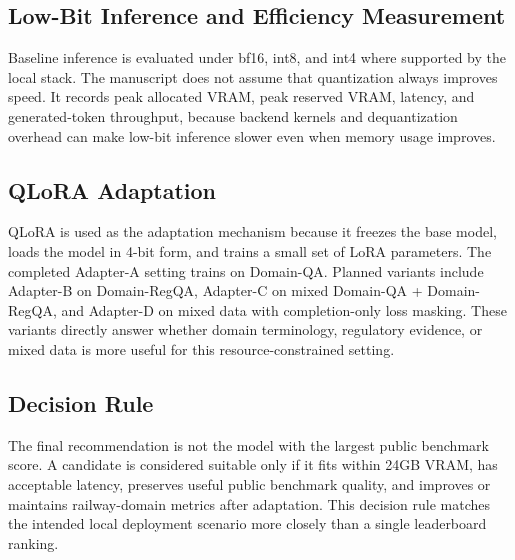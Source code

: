 \subsection{Low-Bit Inference and Efficiency Measurement}

Baseline inference is evaluated under bf16, int8, and int4 where supported by
the local stack. The manuscript does not assume that quantization always
improves speed. It records peak allocated VRAM, peak reserved VRAM, latency,
and generated-token throughput, because backend kernels and dequantization
overhead can make low-bit inference slower even when memory usage improves.

\subsection{QLoRA Adaptation}

QLoRA is used as the adaptation mechanism because it freezes the base model,
loads the model in 4-bit form, and trains a small set of LoRA parameters. The
completed Adapter-A setting trains on Domain-QA. Planned variants include
Adapter-B on Domain-RegQA, Adapter-C on mixed Domain-QA + Domain-RegQA, and
Adapter-D on mixed data with completion-only loss masking. These variants
directly answer whether domain terminology, regulatory evidence, or mixed data
is more useful for this resource-constrained setting.

\subsection{Decision Rule}

The final recommendation is not the model with the largest public benchmark
score. A candidate is considered suitable only if it fits within 24GB VRAM,
has acceptable latency, preserves useful public benchmark quality, and improves
or maintains railway-domain metrics after adaptation. This decision rule
matches the intended local deployment scenario more closely than a single
leaderboard ranking.
